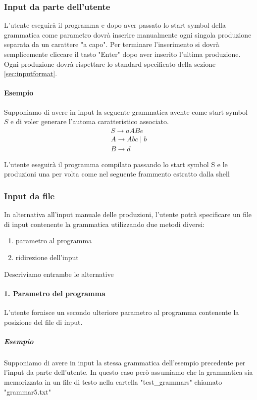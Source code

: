 \documentclass[12pt]{article}
\begin{document}
\subsubsection{Input da parte dell'utente}
L'utente eseguirà il programma e dopo aver passato lo start symbol della grammatica come parametro dovrà inserire manualmente ogni singola produzione separata da un carattere "a capo". Per terminare l'inserimento si dovrà semplicemente cliccare il tasto "Enter" dopo aver inserito l'ultima produzione. Ogni produzione dovrà rispettare lo standard specificato della sezione \ref{sec:inputformat}.\\

\paragraph{Esempio}
Supponiamo di avere in input la seguente grammatica avente come start symbol $S$ e di voler generare l'automa caratteristico associato.
\begin{align*}
    S \to aABe \\
	A \to Abc \mid b \\
	B \to d 
\end{align*}

L'utente eseguirà il programma compilato passando lo start symbol S e le produzioni una per volta come nel seguente frammento estratto dalla shell



\subsubsection{Input da file}
In alternativa all'input manuale delle produzioni, l'utente potrà specificare un file di input contenente la grammatica utilizzando due metodi diversi:
\begin{enumerate}
\item parametro al programma
\item ridirezione dell'input
\end{enumerate}

Descriviamo entrambe le alternative
\paragraph{1. Parametro del programma} L'utente fornisce un secondo ulteriore parametro al programma contenente la posizione del file di input. 

\subparagraph{Esempio}
Supponiamo di avere in input la stessa grammatica dell'esempio precedente per l'input da parte dell'utente. In questo caso però assumiamo che la grammatica sia memorizzata in un file di testo nella cartella "test\_grammars" chiamato "grammar5.txt"\\
\end{document}
